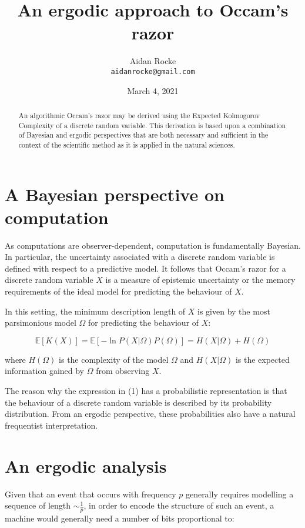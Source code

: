 \documentclass{article}
\title{An ergodic approach to Occam's razor}
\date{March 4, 2021}
\author{%
  Aidan Rocke\\
  \texttt{aidanrocke@gmail.com} \\
}
\begin{document}
\maketitle

\begin{abstract}
An algorithmic Occam's razor may be derived using the Expected Kolmogorov Complexity of a discrete random variable. This derivation is based upon a combination of Bayesian and ergodic perspectives that are both necessary and sufficient in the context of the scientific method as it is applied in the natural sciences. 
\end{abstract}


\section{A Bayesian perspective on computation}

As computations are observer-dependent, computation is fundamentally Bayesian. In particular, the uncertainty associated with a discrete random variable is defined with respect to a predictive model.
It follows that Occam's razor for a discrete random variable $X$ is a measure of epistemic uncertainty or the memory
requirements of the ideal model for predicting the behaviour of $X$.

In this setting, the minimum description length of $X$ is given by the most parsimonious model $\Omega$ for
predicting the behaviour of $X$:

\begin{equation}
\mathbb{E}[K(X)] = \mathbb{E}[-\ln P(X\lvert \Omega)P(\Omega)] = H(X \lvert \Omega) + H(\Omega)
\end{equation}

where $H(\Omega)$ is the complexity of the model $\Omega$ and $H(X \lvert \Omega)$ is the expected information
gained by $\Omega$ from observing $X$. 

The reason why the expression in (1) has a probabilistic representation is that the behaviour of a discrete random variable
is described by its probability distribution. From an ergodic perspective, these
probabilities also have a natural frequentist interpretation. 

\section{An ergodic analysis}

Given that an event that occurs with frequency $p$ generally requires modelling a sequence of length $\sim \frac{1}{p}$,
in order to encode the structure of such an event, a machine would generally need a number of bits proportional to:
\end{document}
